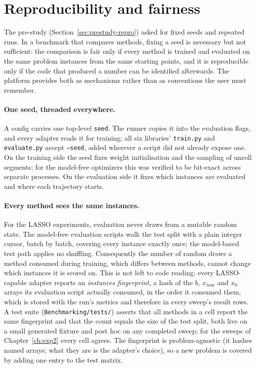 \section{Reproducibility and fairness}
\label{sec:platform-repro}

The pre-study (Section~\ref{sec:prestudy-repro}) asked for fixed seeds and
repeated runs. In a benchmark that compares methods, fixing a seed is
necessary but not sufficient: the comparison is fair only if every method is
trained and evaluated on the same problem instances from the same starting
points, and it is reproducible only if the code that produced a number can be
identified afterwards. The platform provides both as mechanisms rather than
as conventions the user must remember.

\paragraph{One seed, threaded everywhere.}
A config carries one top-level \texttt{seed}. The runner copies it into the
evaluation flags, and every adapter reads it for training; all six
libraries' \texttt{train.py} and \texttt{evaluate.py} accept \texttt{--seed},
added wherever a script did not already expose one. On the training side the seed fixes weight initialisation and the
sampling of unroll segments; for the model-free optimizers this was verified
to be bit-exact across separate processes. On the evaluation side it fixes which
instances are evaluated and where each trajectory starts.

\paragraph{Every method sees the same instances.}
For the LASSO experiments, evaluation never draws from a mutable random
state. The model-free evaluation scripts walk the test split with a plain
integer cursor, batch by batch, covering every instance exactly once; the
model-based test path applies no shuffling. Consequently the number of random
draws a method consumed during training, which differs between methods,
cannot change which instances it is scored on. This is not left to code
reading: every LASSO-capable adapter reports an \emph{instances fingerprint},
a hash of the $b$, $x_\mathrm{true}$ and $x_0$ arrays its evaluation script
actually consumed, in the order it consumed them, which is stored with the
run's metrics and therefore in every sweep's result rows. A test suite
(\texttt{Benchmarking/tests/}) asserts that all methods in a cell report
the same fingerprint and that the count equals the size of the test split,
both live on a small generated fixture and post hoc on any completed sweep;
for the sweeps of Chapter~\ref{ch:exp2} every cell agrees. The fingerprint
is problem-agnostic (it hashes named arrays; what they are is the adapter's
choice), so a new problem is covered by adding one entry to the test matrix.

